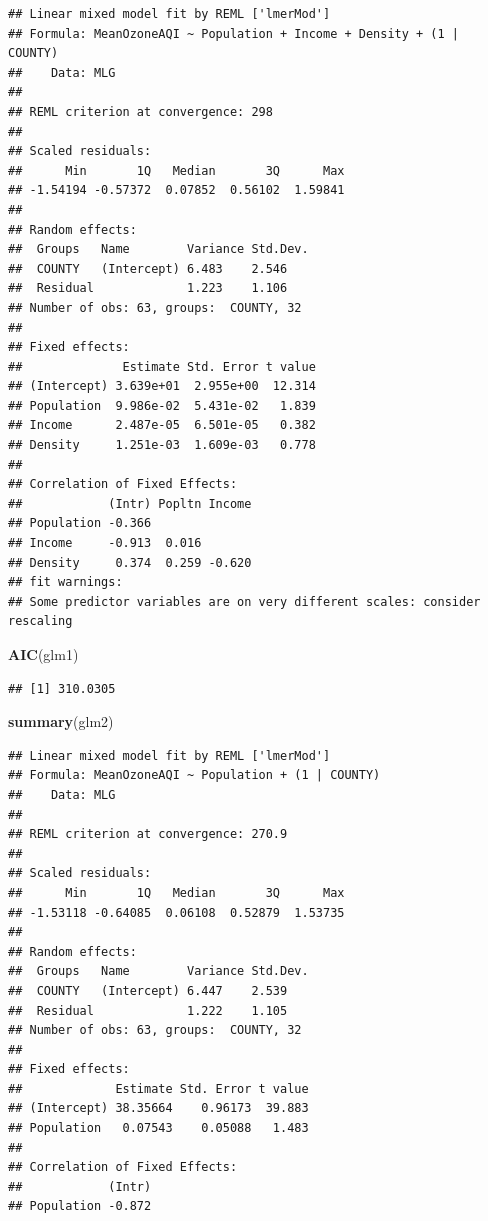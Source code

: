 \documentclass[12pt,]{article}
\newenvironment{Shaded}{\begin{snugshade}}{\end{snugshade}}
\newcommand{\KeywordTok}[1]{\textcolor[rgb]{0.13,0.29,0.53}{\textbf{#1}}}
\newcommand{\NormalTok}[1]{#1}
\begin{document}
\begin{verbatim}
## Linear mixed model fit by REML ['lmerMod']
## Formula: MeanOzoneAQI ~ Population + Income + Density + (1 | COUNTY)
##    Data: MLG
## 
## REML criterion at convergence: 298
## 
## Scaled residuals: 
##      Min       1Q   Median       3Q      Max 
## -1.54194 -0.57372  0.07852  0.56102  1.59841 
## 
## Random effects:
##  Groups   Name        Variance Std.Dev.
##  COUNTY   (Intercept) 6.483    2.546   
##  Residual             1.223    1.106   
## Number of obs: 63, groups:  COUNTY, 32
## 
## Fixed effects:
##              Estimate Std. Error t value
## (Intercept) 3.639e+01  2.955e+00  12.314
## Population  9.986e-02  5.431e-02   1.839
## Income      2.487e-05  6.501e-05   0.382
## Density     1.251e-03  1.609e-03   0.778
## 
## Correlation of Fixed Effects:
##            (Intr) Popltn Income
## Population -0.366              
## Income     -0.913  0.016       
## Density     0.374  0.259 -0.620
## fit warnings:
## Some predictor variables are on very different scales: consider rescaling
\end{verbatim}

\begin{Shaded}
\begin{Highlighting}[]
\KeywordTok{AIC}\NormalTok{(glm1)}
\end{Highlighting}
\end{Shaded}

\begin{verbatim}
## [1] 310.0305
\end{verbatim}

\begin{Shaded}
\begin{Highlighting}[]
\KeywordTok{summary}\NormalTok{(glm2)}
\end{Highlighting}
\end{Shaded}

\begin{verbatim}
## Linear mixed model fit by REML ['lmerMod']
## Formula: MeanOzoneAQI ~ Population + (1 | COUNTY)
##    Data: MLG
## 
## REML criterion at convergence: 270.9
## 
## Scaled residuals: 
##      Min       1Q   Median       3Q      Max 
## -1.53118 -0.64085  0.06108  0.52879  1.53735 
## 
## Random effects:
##  Groups   Name        Variance Std.Dev.
##  COUNTY   (Intercept) 6.447    2.539   
##  Residual             1.222    1.105   
## Number of obs: 63, groups:  COUNTY, 32
## 
## Fixed effects:
##             Estimate Std. Error t value
## (Intercept) 38.35664    0.96173  39.883
## Population   0.07543    0.05088   1.483
## 
## Correlation of Fixed Effects:
##            (Intr)
## Population -0.872
\end{verbatim}
\end{document}
